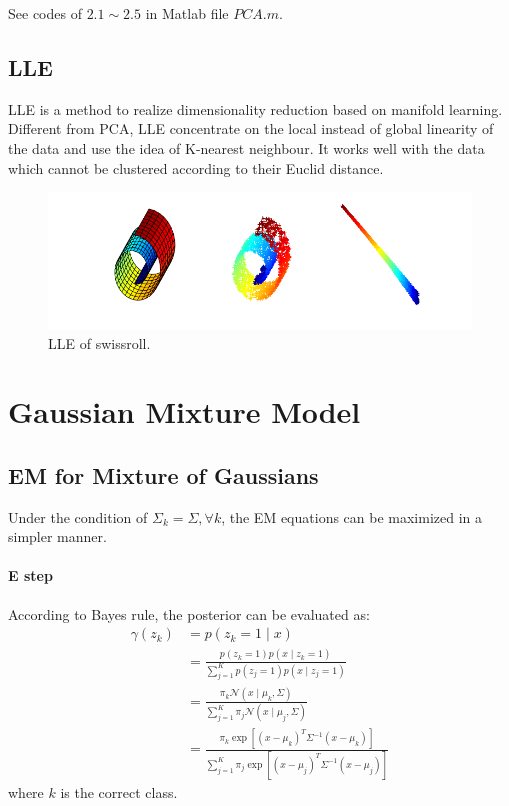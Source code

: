 \documentclass{article}
\begin{document}
See codes of \textbf{$2.1\sim 2.5$} in Matlab file $PCA.m$.

\subsection{LLE}
LLE is a method to realize dimensionality reduction based on manifold learning. Different from PCA, LLE concentrate on the local instead of global linearity of the data and use the idea of K-nearest neighbour. It works well with the data which cannot be clustered according to their Euclid distance.

\begin{figure}[H]
	\centering
	\includegraphics[scale=0.8]{figure15}
	\caption{LLE of swissroll.}
	\label{fig15}
\end{figure}
\pagebreak

\section{Gaussian Mixture Model}

\subsection{EM for Mixture of Gaussians}
Under the condition of $\Sigma_k=\Sigma,\forall k$, the EM equations can be maximized in a simpler manner.

\paragraph{E step}According to Bayes rule, the posterior can be evaluated as:
\[
\begin{aligned}
\gamma(z_k)&=p(z_k=1\mid x)\\
&=\frac{p(z_k=1)p(x\mid z_k=1)}{\sum_{j=1}^Kp(z_j=1)p(x\mid z_j=1)}\\
&=\frac{\pi_k\mathcal N(x\mid \mu_k,\Sigma)}{\sum_{j=1}^K\pi_j\mathcal N(x\mid \mu_j,\Sigma)}\\
&=\frac{\pi_k \exp[(x-\mu_k)^T\Sigma^{-1}(x-\mu_k)]}{\sum_{j=1}^K\pi_j \exp[(x-\mu_j)^T\Sigma^{-1}(x-\mu_j)]}
\end{aligned}
\]
where $k$ is the correct class.
\end{document}
